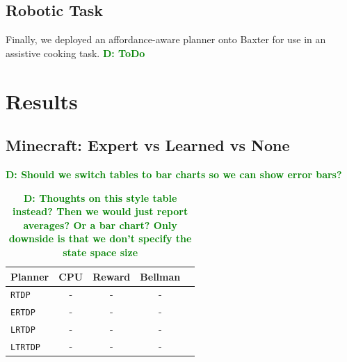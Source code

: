 \documentclass[conference]{IEEEtran}
\newcommand{\dnote}[1]{\textcolor{Green}{\textbf{D: #1}}}
\begin{document}
\subsection{Robotic Task}
Finally, we deployed an affordance-aware planner onto Baxter for use
in an assistive cooking task. \dnote{ToDo}

\section{Results}
\label{sec:results}

\subsection{Minecraft: Expert vs Learned vs None}

\dnote{Should we switch tables to bar charts so we can show error bars?}


\begin{table}[H]
\centering
\begin{tabular}{ l  || c c c c}
  Planner 				&	CPU	&	Reward 	& Bellman \\ \hline
  \texttt{RTDP}  			& 	-	&	-		&	-		\\
  \texttt{ERTDP}  		& 	-	&	-		&	-		\\
  \texttt{LRTDP}  		& 	-	&	-		&	-		\\
  \texttt{LTRTDP}  		& 	-	&	-		&	-		\\
\end{tabular}
\caption{\dnote{Thoughts on this style table instead? Then we would just report averages? Or a bar chart? Only downside is that we don't specify the state space size}}
\label{table:minecraft_results_bellman}
\end{table}
\end{document}
